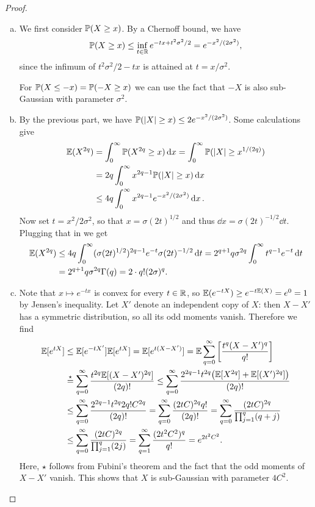 \begin{proof}
    \begin{enumerate}[(a)]
        \item We first consider $\mathbb P(X \geq x)$. 
        By a Chernoff bound, we have
        \[
        \mathbb P(X \geq x) \leq \inf_{t \in \mathbb R} e^{-tx + t^2\sigma^2/2} = e^{-x^2/(2\sigma^2)}, 
        \]
        since the infimum of $t^2\sigma^2/2 - tx$ is attained at $t = x/\sigma^2$.
        
        For $\mathbb P(X \leq -x) = \mathbb P(-X \geq x)$ we can use the fact that $-X$ is also sub-Gaussian with parameter $\sigma^2$. 
        
        \item By the previous part, we have $\mathbb P(\abs{X} \geq x) \leq 2 e^{-x^2/(2\sigma^2)}$. Some calculations give
        \begin{align*}
            \mathbb E(X^{2q}) &= \int_0^\infty \mathbb P(X^{2q} \geq x) \dd{x} = \int_0^\infty \mathbb P(\abs{X} \geq x^{1/(2q)}) \\
            &= 2q \int_0^\infty x^{2q - 1} \mathbb P(\abs{X}\geq x)\dd{x} \\
             &\leq 4q \int_0^\infty x^{2q - 1} e^{-x^2/(2\sigma^2)} \dd{x}.
        \end{align*}
    Now set $t = x^2/2\sigma^2$, so that $x = \sigma (2t)^{1/2}$ and thus $\dd{x} = \sigma (2t)^{-1/2} \dd{t}$. Plugging that in we get
    \begin{align*}
    \mathbb E(X^{2q}) &\leq 4q \int_0^\infty (\sigma(2t)^{1/2})^{2q - 1} e^{-t} \sigma (2t)^{-1/2} \dd{t} = 2^{q+1} q \sigma^{2q} \int_0^\infty t^{q-1} e^{-t} \dd{t} \\
    &= 2^{q+1} q \sigma^{2q} \Gamma(q) = 2 \cdot q! (2\sigma)^q. 
    \end{align*}

\item Note that $x \mapsto e^{-tx}$ is convex for every $t \in \mathbb R$, so $\mathbb E(e^{-tX}) \geq e^{-t \mathbb E(X)} = e^{0} = 1$ by Jensen's inequality. Let $X'$ denote an independent copy of $X$: then $X - X'$ has a symmetric distribution, so all its odd moments vanish. Therefore we find
\begin{align*}
	\mathbb E[e^{tX}] &\leq \mathbb E[e^{-tX'}] \mathbb E[e^{tX}] = \mathbb E[e^{t(X - X')}]= \mathbb E \sum_{q=0}^\infty \qty[\frac{t^q (X - X')^{q}}{q!}] 
	\\
	&\overset\star= \sum_{q=0}^\infty \frac{t^{2q} \mathbb E[(X - X')^{2q}]}{(2q)!} \leq \sum_{q=0}^\infty \frac{2^{2q-1} t^{2q} \qty(\mathbb E[X^{2q}] + \mathbb E[(X')^{2q}])}{(2q)!} \\
	&\leq \sum_{q=0}^\infty  \frac{2^{2q - 1}t^{2q} 2 q! C^{2q}}{(2q)!} =\sum_{q=0}^\infty  \frac{(2tC)^{2q}q!}{(2q)!} = \sum_{q=0}^\infty \frac{(2tC)^{2q}}{\prod_{j=1}^q (q+j)} \\
	&\leq \sum_{q=0}^\infty \frac{(2tC)^{2q}}{\prod_{j=1}^q (2j)} = \sum_{q=1}^\infty \frac{(2t^2C^2)^q}{q!} = e^{2t^2C^2}.
\end{align*}
Here, $\star$ follows from Fubini's theorem and the fact that the odd moments of $X - X'$ vanish. 
This shows that $X$ is sub-Gaussian with parameter $4C^2$. 
    \end{enumerate}
\end{proof}

